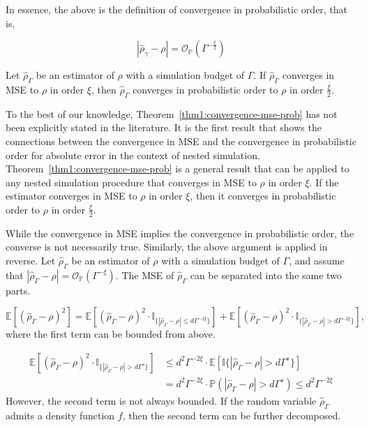 In essence, the above is the definition of convergence in probabilistic order, that is,

$$
    \left| \hat{\rho}_{\gamma} - \rho \right| = \mathcal{O}_\mathbb{P} \left( \Gamma^{-\frac{\xi}{2}} \right)
$$

\begin{theorem} \label{thm1:convergence-mse-prob}
    Let $\hat{\rho}_{\Gamma}$ be an estimator of $\rho$ with a simulation budget of $\Gamma$. 
    If $\hat{\rho}_{\Gamma}$ converges in MSE to $\rho$ in order $\xi$, then $\hat{\rho}_{\Gamma}$ converges in probabilistic order to $\rho$ in order $\frac{\xi}{2}$.
\end{theorem}

To the best of our knowledge, Theorem~\ref{thm1:convergence-mse-prob} has not been explicitly stated in the literature.
It is the first result that shows the connections between the convergence in MSE and the convergence in probabilistic order for absolute error in the context of nested simulation.
Theorem~\ref{thm1:convergence-mse-prob} is a general result that can be applied to any nested simulation procedure that converges in MSE to $\rho$ in order $\xi$.
If the estimator converges in MSE to $\rho$ in order $\xi$, then it converges in probabilistic order to $\rho$ in order $\frac{\xi}{2}$.

While the convergence in MSE implies the convergence in probabilistic order, the converse is not necessarily true.
Similarly, the above argument is applied in reverse.
Let $\hat{\rho}_{\Gamma}$ be an estimator of $\rho$ with a simulation budget of $\Gamma$, and assume that $|\hat{\rho}_{\Gamma} - \rho| = \mathcal{O}_{\mathbb{P}}(\Gamma^{-\xi})$.
The MSE of $\hat{\rho}_{\Gamma}$ can be separated into the same two parts.

$$
    \mathbb{E}\left[ \left(\hat{\rho}_{\Gamma} - \rho\right)^2 \right] = \mathbb{E} \left[ \left(\hat{\rho}_{\Gamma} - \rho\right)^2 \cdot \mathbb{I}_{\{|\hat{\rho}_{\Gamma} - \rho| \leq d\Gamma^{-2\xi}\}} \right] + \mathbb{E} \left[ \left(\hat{\rho}_{\Gamma} - \rho\right)^2 \cdot \mathbb{I}_{\{|\hat{\rho}_{\Gamma} - \rho| > d\Gamma^{-2\xi}\}} \right], 
$$
where the first term can be bounded from above.

\begin{align*}
    \mathbb{E} \left[ \left(\hat{\rho}_{\Gamma} - \rho\right)^2 \cdot \mathbb{I}_{\{|\hat{\rho}_{\Gamma} - \rho| > d\Gamma^s\}} \right] 
    & \leq d^2 \Gamma^{-2\xi} \cdot \mathbb{E} \left[ \mathbb{I}\{|\hat{\rho}_{\Gamma} - \rho| > d\Gamma^s \} \right] \\
    & = d^2 \Gamma^{-2\xi} \cdot \mathbb{P} \left(|\hat{\rho}_{\Gamma} - \rho| > d\Gamma^s \right) \leq d^2 \Gamma^{-2\xi} 
\end{align*}
However, the second term is not always bounded. 
If the random variable $\hat{\rho}_{\Gamma}$ admits a density function $f$, then the second term can be further decomposed.

